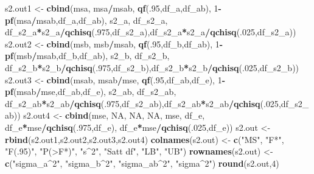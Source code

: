 \documentclass[
]{book}
\newenvironment{Shaded}{\begin{snugshade}}{\end{snugshade}}
\newcommand{\ConstantTok}[1]{\textcolor[rgb]{0.56,0.35,0.01}{#1}}
\newcommand{\DecValTok}[1]{\textcolor[rgb]{0.00,0.00,0.81}{#1}}
\newcommand{\FunctionTok}[1]{\textcolor[rgb]{0.13,0.29,0.53}{\textbf{#1}}}
\newcommand{\NormalTok}[1]{#1}
\newcommand{\OtherTok}[1]{\textcolor[rgb]{0.56,0.35,0.01}{#1}}
\newcommand{\SpecialCharTok}[1]{\textcolor[rgb]{0.81,0.36,0.00}{\textbf{#1}}}
\newcommand{\StringTok}[1]{\textcolor[rgb]{0.31,0.60,0.02}{#1}}
\begin{document}
\begin{Shaded}
\begin{Highlighting}[]
\NormalTok{s2.out1 }\OtherTok{\textless{}{-}} \FunctionTok{cbind}\NormalTok{(msa, msa}\SpecialCharTok{/}\NormalTok{msab, }\FunctionTok{qf}\NormalTok{(.}\DecValTok{95}\NormalTok{,df\_a,df\_ab), }\DecValTok{1}\SpecialCharTok{{-}}\FunctionTok{pf}\NormalTok{(msa}\SpecialCharTok{/}\NormalTok{msab,df\_a,df\_ab),}
\NormalTok{                 s2\_a, df\_s2\_a, df\_s2\_a}\SpecialCharTok{*}\NormalTok{s2\_a}\SpecialCharTok{/}\FunctionTok{qchisq}\NormalTok{(.}\DecValTok{975}\NormalTok{,df\_s2\_a),df\_s2\_a}\SpecialCharTok{*}\NormalTok{s2\_a}\SpecialCharTok{/}\FunctionTok{qchisq}\NormalTok{(.}\DecValTok{025}\NormalTok{,df\_s2\_a))}
\NormalTok{s2.out2 }\OtherTok{\textless{}{-}} \FunctionTok{cbind}\NormalTok{(msb, msb}\SpecialCharTok{/}\NormalTok{msab, }\FunctionTok{qf}\NormalTok{(.}\DecValTok{95}\NormalTok{,df\_b,df\_ab), }\DecValTok{1}\SpecialCharTok{{-}}\FunctionTok{pf}\NormalTok{(msb}\SpecialCharTok{/}\NormalTok{msab,df\_b,df\_ab),}
\NormalTok{                 s2\_b, df\_s2\_b, df\_s2\_b}\SpecialCharTok{*}\NormalTok{s2\_b}\SpecialCharTok{/}\FunctionTok{qchisq}\NormalTok{(.}\DecValTok{975}\NormalTok{,df\_s2\_b),df\_s2\_b}\SpecialCharTok{*}\NormalTok{s2\_b}\SpecialCharTok{/}\FunctionTok{qchisq}\NormalTok{(.}\DecValTok{025}\NormalTok{,df\_s2\_b))}
\NormalTok{s2.out3 }\OtherTok{\textless{}{-}} \FunctionTok{cbind}\NormalTok{(msab, msab}\SpecialCharTok{/}\NormalTok{mse, }\FunctionTok{qf}\NormalTok{(.}\DecValTok{95}\NormalTok{,df\_ab,df\_e), }\DecValTok{1}\SpecialCharTok{{-}}\FunctionTok{pf}\NormalTok{(msab}\SpecialCharTok{/}\NormalTok{mse,df\_ab,df\_e),}
\NormalTok{                 s2\_ab, df\_s2\_ab, df\_s2\_ab}\SpecialCharTok{*}\NormalTok{s2\_ab}\SpecialCharTok{/}\FunctionTok{qchisq}\NormalTok{(.}\DecValTok{975}\NormalTok{,df\_s2\_ab),df\_s2\_ab}\SpecialCharTok{*}\NormalTok{s2\_ab}\SpecialCharTok{/}\FunctionTok{qchisq}\NormalTok{(.}\DecValTok{025}\NormalTok{,df\_s2\_ab))}
\NormalTok{s2.out4 }\OtherTok{\textless{}{-}} \FunctionTok{cbind}\NormalTok{(mse, }\ConstantTok{NA}\NormalTok{, }\ConstantTok{NA}\NormalTok{, }\ConstantTok{NA}\NormalTok{, mse, df\_e, df\_e}\SpecialCharTok{*}\NormalTok{mse}\SpecialCharTok{/}\FunctionTok{qchisq}\NormalTok{(.}\DecValTok{975}\NormalTok{,df\_e),}
\NormalTok{                 df\_e}\SpecialCharTok{*}\NormalTok{mse}\SpecialCharTok{/}\FunctionTok{qchisq}\NormalTok{(.}\DecValTok{025}\NormalTok{,df\_e))}
\NormalTok{s2.out }\OtherTok{\textless{}{-}} \FunctionTok{rbind}\NormalTok{(s2.out1,s2.out2,s2.out3,s2.out4)}
\FunctionTok{colnames}\NormalTok{(s2.out) }\OtherTok{\textless{}{-}} \FunctionTok{c}\NormalTok{(}\StringTok{"MS"}\NormalTok{, }\StringTok{"F*"}\NormalTok{, }\StringTok{"F(.95)"}\NormalTok{, }\StringTok{"P(\textgreater{}F*)"}\NormalTok{, }\StringTok{"s\^{}2"}\NormalTok{, }\StringTok{"Satt df"}\NormalTok{, }\StringTok{"LB"}\NormalTok{, }\StringTok{"UB"}\NormalTok{)}
\FunctionTok{rownames}\NormalTok{(s2.out) }\OtherTok{\textless{}{-}} \FunctionTok{c}\NormalTok{(}\StringTok{"sigma\_a\^{}2"}\NormalTok{, }\StringTok{"sigma\_b\^{}2"}\NormalTok{, }\StringTok{"sigma\_ab\^{}2"}\NormalTok{, }\StringTok{"sigma\^{}2"}\NormalTok{)}
\FunctionTok{round}\NormalTok{(s2.out,}\DecValTok{4}\NormalTok{)}
\end{Highlighting}
\end{Shaded}
\end{document}
